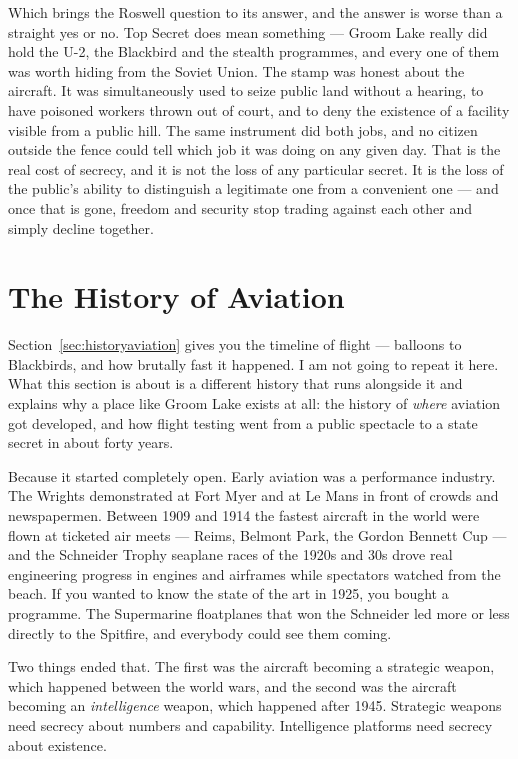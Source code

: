 Which brings the Roswell question to its answer, and the answer is worse than a straight yes or no.
Top Secret does mean something --- Groom Lake really did hold the U-2, the Blackbird and the
stealth programmes, and every one of them was worth hiding from the Soviet Union. The stamp was
honest about the aircraft. It was simultaneously used to seize public land without a hearing, to
have poisoned workers thrown out of court, and to deny the existence of a facility visible from a
public hill. The same instrument did both jobs, and no citizen outside the fence could tell which
job it was doing on any given day. That is the real cost of secrecy, and it is not the loss of any
particular secret. It is the loss of the public's ability to distinguish a legitimate one from a
convenient one --- and once that is gone, freedom and security stop trading against each other and
simply decline together.

\section{The History of Aviation}\label{sec:aviationsecrecy}

Section~\ref{sec:historyaviation} gives you the timeline of flight --- balloons to Blackbirds, and how brutally fast it
happened. I am not going to repeat it here. What this section is about is a different history that
runs alongside it and explains why a place like Groom Lake exists at all: the history of \emph{where}
aviation got developed, and how flight testing went from a public spectacle to a state secret in
about forty years.

Because it started completely open. Early aviation was a performance industry. The Wrights
demonstrated at Fort Myer and at Le Mans in front of crowds and newspapermen. Between 1909 and 1914
the fastest aircraft in the world were flown at ticketed air meets --- Reims, Belmont Park,
the Gordon Bennett Cup --- and the Schneider Trophy seaplane races of the 1920s and 30s drove real
engineering progress in engines and airframes while spectators watched from the beach. If you
wanted to know the state of the art in 1925, you bought a programme. The Supermarine floatplanes
that won the Schneider led more or less directly to the Spitfire, and everybody could see them
coming.

Two things ended that. The first was the aircraft becoming a strategic weapon, which happened
between the world wars, and the second was the aircraft becoming an \emph{intelligence} weapon,
which happened after 1945. Strategic weapons need secrecy about numbers and capability.
Intelligence platforms need secrecy about existence.

